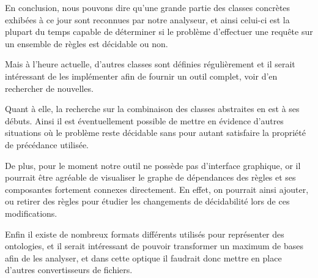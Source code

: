 
En conclusion, nous pouvons dire qu'une grande partie des classes concrètes exhibées à ce
jour sont reconnues par notre analyseur, et ainsi celui-ci est la plupart du temps 
capable de déterminer si
le problème d'effectuer une requête sur un ensemble de règles est décidable ou non.

Mais à l'heure actuelle, d'autres classes sont définies
régulièrement et il serait intéressant de les implémenter afin de fournir un outil
complet, voir d'en rechercher de nouvelles.

Quant à elle, la recherche sur la combinaison des classes abstraites en est à ses débuts. 
Ainsi il est
éventuellement possible de mettre en évidence d'autres situations où le problème reste
décidable sans pour autant satisfaire la propriété de précédance utilisée.

De plus, pour le moment notre outil ne possède pas d'interface graphique, or il pourrait
être
agréable de visualiser le graphe de dépendances des règles et ses composantes fortement 
connexes directement. En effet, on pourrait ainsi ajouter, ou retirer des règles pour
étudier les changements de décidabilité lors de ces modifications.

Enfin il existe de nombreux formats différents utilisés pour représenter des ontologies,
et il serait intéressant de pouvoir transformer un maximum de bases afin de les
analyser, et dans cette optique il faudrait donc mettre en place d'autres convertisseurs
de fichiers.

